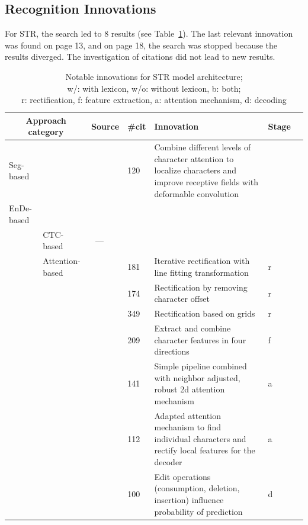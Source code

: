 \subsection{Recognition Innovations}
For \ac{STR}, the search led to 8 results (see Table~\ref{tb:STR-steps-properties}).
The last relevant innovation was found on page 13, and on page 18, the search was stopped because
the results diverged.
The investigation of citations did not lead to new results.
\begin{table}[ht]
    \centering\scriptsize
    \begin{tabular}{p{}p{}p{}p{}
            p{}p{}p{}}
        \multicolumn{2}{c}{\textbf{Approach category}} & \textbf{Source} & \textbf{\#cit}
                                       & \textbf{Innovation} & \textbf{Stage} \\
        \toprule
        Seg-based & &~\cite{liao_scene_2018} & 120 & Combine different levels of character attention
            to localize characters and improve receptive fields with deformable convolution \\
        \midrule
        EnDe-based & & & \\
            & CTC-based &~--- & & \\
            & Attention-based &~\cite{zhan_esir_2019} & 181 & Iterative rectification with line
                fitting transformation & r \\
            & &~\cite{luo_multi-object_2019} & 174 & Rectification by removing character offset & r \\
            & &~\cite{shi_aster_2019} & 349 & Rectification based on grids & r \\
            & &~\cite{cheng_aon_2018} & 209 & Extract and combine character features in four
                directions & f \\
            & &~\cite{li_show_2019} & 141 & Simple pipeline combined with neighbor adjusted, robust
                2d attention mechanism & a\\
            & &~\cite{liu_char-net_2018} & 112 & Adapted attention mechanism to find
                individual characters and rectify local features for the decoder & a \\
            & &~\cite{bai_edit_2018} & 100 & Edit operations (consumption, deletion, insertion)
                influence probability of prediction & d \\
        \bottomrule
    \end{tabular}
    \captionsetup{justification=centering}
    \caption[Notable innovations for STR model architecture]{%
        Notable innovations for STR model architecture; \\
        w/: with lexicon, w/o: without lexicon, b: both; \\
        r: rectification, f: feature extraction, a: attention mechanism,
        d: decoding\label{tb:STR-steps-properties}
    }
\end{table}

